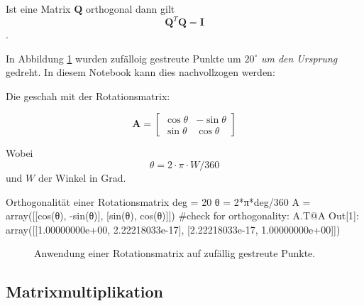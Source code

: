 Ist eine Matrix $\mathbf{Q}$ orthogonal dann gilt 
$$ \mathbf{Q}^T\mathbf{Q} = \mathbf{I} $$.


In Abbildung \ref{fig:rotMat} wurden zufälloig gestreute Punkte um $20^\circ$ \emph{um den Ursprung} gedreht. In diesem Notebook kann dies nachvollzogen werden: 

Die geschah mit der Rotationsmatrix:


\begin{equation}
    {\displaystyle \mathbf{A}={\begin{bmatrix}\cos \theta &-\sin \theta \\\sin \theta &\cos \theta \end{bmatrix}}}
\end{equation}

Wobei $$\theta = 2\cdot \pi \cdot W / 360$$ und $W$ der Winkel in Grad.

\begin{python}{Orthogonalität einer Rotationsmatrix}
deg = 20
θ = 2*π*deg/360 
A = array([[cos(θ), -sin(θ)],
           [sin(θ), cos(θ)]])
#check for orthogonality:
A.T@A
Out[1]: array([[1.00000000e+00, 2.22218033e-17],
       [2.22218033e-17, 1.00000000e+00]])

\end{python}



\begin{figure}[H]
    \centering
    
    \caption{Anwendung einer Rotationsmatrix auf zufällig gestreute Punkte.}
    \label{fig:rotMat}
\end{figure}






\subsection*{Matrixmultiplikation}

